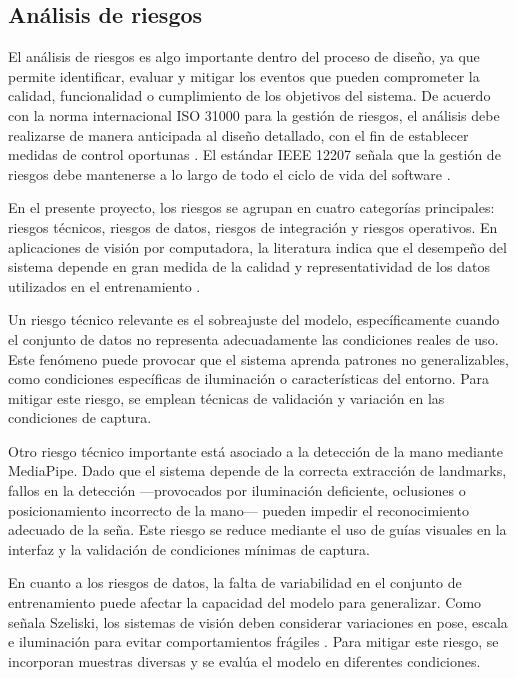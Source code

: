	\subsection{Análisis de riesgos}
	
	El análisis de riesgos es algo importante dentro del proceso de diseño, ya que permite identificar, evaluar y mitigar los eventos que pueden comprometer la calidad, funcionalidad o cumplimiento de los objetivos del sistema. De acuerdo con la norma internacional ISO 31000 para la gestión de riesgos, el análisis debe realizarse de manera anticipada al diseño detallado, con el fin de establecer medidas de control oportunas \cite{iso31000}. El estándar IEEE 12207 señala que la gestión de riesgos debe mantenerse a lo largo de todo el ciclo de vida del software \cite{ieee12207}.
	
	En el presente proyecto, los riesgos se agrupan en cuatro categorías principales: riesgos técnicos, riesgos de datos, riesgos de integración y riesgos operativos. En aplicaciones de visión por computadora, la literatura indica que el desempeño del sistema depende en gran medida de la calidad y representatividad de los datos utilizados en el entrenamiento \cite{goodfellow2016}.
	
	Un riesgo técnico relevante es el sobreajuste del modelo, específicamente cuando el conjunto de datos no representa adecuadamente las condiciones reales de uso. Este fenómeno puede provocar que el sistema aprenda patrones no generalizables, como condiciones específicas de iluminación o características del entorno. Para mitigar este riesgo, se emplean técnicas de validación y variación en las condiciones de captura.
	
	Otro riesgo técnico importante está asociado a la detección de la mano mediante MediaPipe. Dado que el sistema depende de la correcta extracción de landmarks, fallos en la detección —provocados por iluminación deficiente, oclusiones o posicionamiento incorrecto de la mano— pueden impedir el reconocimiento adecuado de la seña. Este riesgo se reduce mediante el uso de guías visuales en la interfaz y la validación de condiciones mínimas de captura.
	
	En cuanto a los riesgos de datos, la falta de variabilidad en el conjunto de entrenamiento puede afectar la capacidad del modelo para generalizar. Como señala Szeliski, los sistemas de visión deben considerar variaciones en pose, escala e iluminación para evitar comportamientos frágiles \cite{szeliski2010}. Para mitigar este riesgo, se incorporan muestras diversas y se evalúa el modelo en diferentes condiciones.
	
